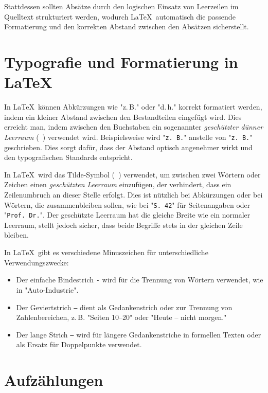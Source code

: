 Stattdessen sollten Absätze durch den logischen Einsatz von Leerzeilen im
Quelltext strukturiert werden, wodurch \LaTeX\ automatisch die passende
Formatierung und den korrekten Abstand zwischen den Absätzen sicherstellt.


\section{Typografie und Formatierung in LaTeX}

In \LaTeX\ können Abkürzungen wie "z.\,B." oder "d.\,h." korrekt formatiert
werden, indem ein kleiner Abstand zwischen den Bestandteilen eingefügt wird.
Dies erreicht man, indem zwischen den Buchstaben ein sogenannter
\textit{geschützter dünner Leerraum} (\texttt{\,}) verwendet wird.
Beispielsweise wird "\texttt{z.\,B.}" anstelle von
"\texttt{z. B.}" geschrieben. Dies sorgt dafür, dass der Abstand
optisch angenehmer wirkt und den typografischen Standards entspricht.

In \LaTeX\ wird das Tilde-Symbol (\texttt{~}) verwendet, um zwischen
zwei Wörtern oder Zeichen einen \textit{geschützten Leerraum} einzufügen, der
verhindert, dass ein Zeilenumbruch an dieser Stelle erfolgt. Dies ist nützlich
bei Abkürzungen oder bei Wörtern, die zusammenbleiben sollen, wie bei
"\texttt{S.~42}" für Seitenangaben oder
"\texttt{Prof.~Dr.}". Der geschützte Leerraum hat die gleiche Breite
wie ein normaler Leerraum, stellt jedoch sicher, dass beide Begriffe stets in
der gleichen Zeile bleiben.

In \LaTeX\ gibt es verschiedene Minuszeichen für unterschiedliche Verwendungszwecke:

\begin{itemize}
  \item Der einfache Bindestrich \texttt{-} wird für die Trennung von
  Wörtern verwendet, wie in "Auto-Industrie".
  \item Der Geviertstrich \texttt{--} dient als Gedankenstrich oder
  zur Trennung von Zahlenbereichen, z.\,B. "Seiten 10--20" oder "Heute -- nicht
  morgen."
  \item Der lange Strich \texttt{---} wird für längere Gedankenstriche
  in formellen Texten oder als Ersatz für Doppelpunkte verwendet.
\end{itemize}


\section{Aufzählungen}

